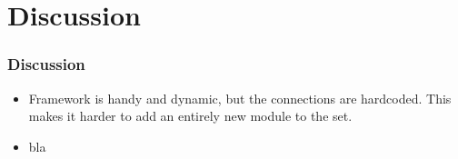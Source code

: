 \documentclass{beamer}
\begin{document}
{
      \begin{frame}
      \end{frame}
}
{
      \begin{frame}
      \end{frame}
}

\section{Discussion}
\begin{frame}
\frametitle{Discussion}
\begin{itemize}
\item Framework is handy and dynamic, but the connections are hardcoded. This makes it
harder to add an entirely new module to the set.
\item bla
\end{itemize}
\end{frame}
\end{document}
